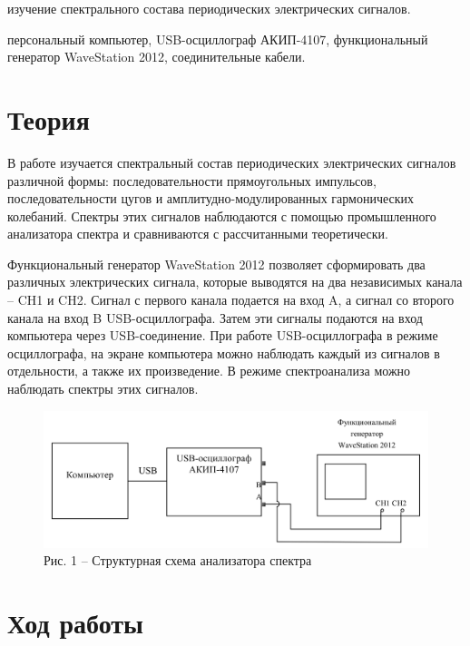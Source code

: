 \documentclass[a4paper,14pt]{article}
\begin{document}
\author{Рябых Владислав и Валеев Сергей, Б05-905}
\title{}
\maketitle

 изучение спектрального состава периодических электрических сигналов.

 персональный компьютер, USB-осциллограф АКИП-4107,  функциональный генератор WaveStation 2012, соединительные кабели.


\section*{Теория}

В работе изучается спектральный состав периодических электрических сигналов различной формы: последовательности прямоугольных импульсов, последовательности цугов и амплитудно-модулированных гармонических колебаний. Спектры этих сигналов наблюдаются с помощью промышленного анализатора спектра и сравниваются с рассчитанными теоретически. 

Функциональный генератор WaveStation 2012 позволяет сформировать два различных электрических сигнала, которые выводятся на два независимых канала -- CH1 и CH2. Сигнал с первого канала подается на вход A, а сигнал со второго канала на вход B USB-осциллографа. Затем эти сигналы подаются на вход компьютера через USB-соединение. При работе USB-осциллографа в режиме осциллографа, на экране компьютера можно наблюдать каждый из сигналов в отдельности, а также их произведение. В режиме спектроанализа можно наблюдать спектры этих сигналов.

\begin{figure}[!h]
	\centering
	\includegraphics[width = 12cm]{first} \\
	Рис. 1 -- Структурная схема анализатора спектра
\end{figure}

\section*{Ход работы}
\end{document}
